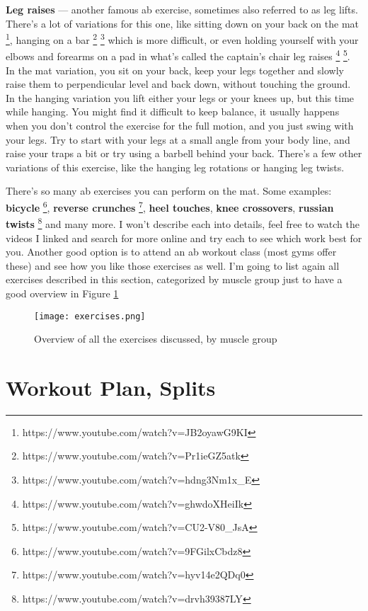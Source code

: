 \documentclass[openany, 12pt]{book}
\begin{document}
        \textbf{Leg raises}
        --- another famous ab exercise, sometimes also referred to as leg lifts. There's a lot of variations for this one, like sitting down on your back on the mat
        \footnote{https://www.youtube.com/watch?v=JB2oyawG9KI}, hanging on a bar
        \footnote{https://www.youtube.com/watch?v=Pr1ieGZ5atk}
        \footnote{https://www.youtube.com/watch?v=hdng3Nm1x\_E}
        which is more difficult, or even holding yourself with your elbows and forearms on a pad in what's called the captain's chair leg raises
        \footnote{https://www.youtube.com/watch?v=ghwdoXHeiIk}
        \footnote{https://www.youtube.com/watch?v=CU2-V80\_JsA}.
        In the mat variation, you sit on your back, keep your legs together and slowly raise them to perpendicular level and back down, without touching the ground.
        In the hanging variation you lift either your legs or your knees up, but this time while hanging. You might find it difficult to keep balance, it usually happens when you
        don't control the exercise for the full motion, and you just swing with your legs. Try to start with your legs at a small angle from your body line, and raise your traps a bit
         or try using a barbell behind your back. There's a few other variations of this exercise, like the hanging leg rotations or hanging leg twists.

        There's so many ab exercises you can perform on the mat. Some examples: \textbf{bicycle}
        \footnote{https://www.youtube.com/watch?v=9FGilxCbdz8}, \textbf{reverse crunches}
        \footnote{https://www.youtube.com/watch?v=hyv14e2QDq0}, \textbf{heel touches}, \textbf{knee crossovers},
        \textbf{russian twists}
        \footnote{https://www.youtube.com/watch?v=drvh39387LY} and many more.
        I won't describe each into details, feel free to watch the videos I linked and search for more online and try each to see which work best for you. Another good option is to attend an
        ab workout class (most gyms offer these) and see how you like those exercises as well. I'm going to list again all exercises described in this section, categorized by muscle group
        just to have a good overview in Figure \ref{fig11}
        
	\begin{figure}[h]
		\centering
		\texttt{[image: exercises.png]}
		\caption{Overview of all the exercises discussed, by muscle group}
		\label{fig11}
	\end{figure}

        \section{Workout Plan, Splits}
\end{document}

